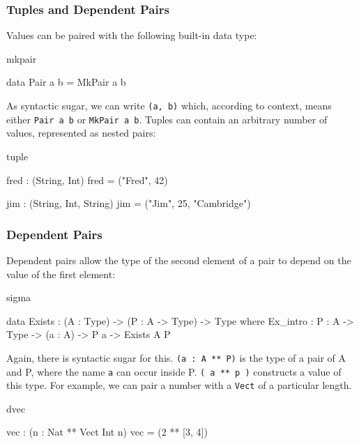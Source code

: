 \subsubsection{Tuples and Dependent Pairs}

Values can be paired with the following built-in data type:

\begin{SaveVerbatim}{mkpair}

data Pair a b = MkPair a b

\end{SaveVerbatim}

\noindent
As syntactic sugar, we can write \texttt{(a, b)} which, according to context,
means either \texttt{Pair a b} or \texttt{MkPair a b}.
Tuples can contain an arbitrary number of values, represented as nested pairs:

\begin{SaveVerbatim}{tuple}

fred : (String, Int)
fred = ("Fred", 42)

jim : (String, Int, String)
jim = ("Jim", 25, "Cambridge")

\end{SaveVerbatim}

\subsubsection*{Dependent Pairs}

Dependent pairs allow the type of the second element of a pair to depend on
the value of the first element:

\begin{SaveVerbatim}{sigma}

data Exists : (A : Type) -> (P : A -> Type) -> Type where
   Ex_intro : {P : A -> Type} -> (a : A) -> P a -> Exists A P

\end{SaveVerbatim}

\noindent
Again, there is syntactic sugar for this. \texttt{(a : A ** P)} is the type of a pair of
A and P, where the name \texttt{a} can occur inside P. \texttt{( a ** p )} 
constructs a value of this type. For example, we can pair a number with a 
\texttt{Vect} of a particular length.

\begin{SaveVerbatim}{dvec}

vec : (n : Nat ** Vect Int n)
vec = (2 ** [3, 4])

\end{SaveVerbatim}

